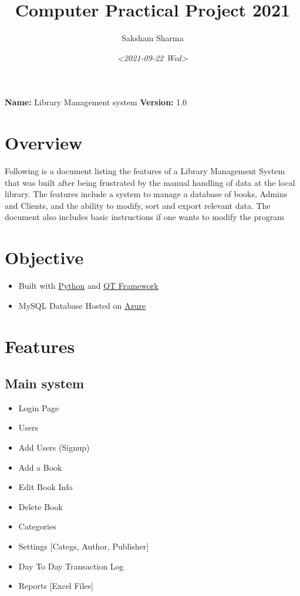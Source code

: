 \documentclass[11pt]{article}
\author{Saksham Sharma}
\date{\textit{<2021-09-22 Wed>}}
\title{Computer Practical Project 2021}
\begin{document}
\maketitle
\tableofcontents

\textbf{\textbf{Name:}} Library Management system
\textbf{\textbf{Version:}} 1.0

\section{Overview}
\label{sec:org83c6530}
Following is a document listing the features of a Library Management System that was built after being frustrated by the manual handling of data at the local library. The features include a system to manage a database of books, Admins and Clients, and the ability to modify, sort and export relevant data.
The document also includes basic instructions if one wants to modify the program

\section{Objective}
\label{sec:orgd7d8056}
\begin{itemize}
\item Built with \href{https://www.python.org/}{Python} and \href{https://www.qt.io/}{QT Framework}
\item MySQL Database Hosted on \href{//azure.microsoft.com}{Azure}
\end{itemize}

\section{Features}
\label{sec:org6a543fb}
\subsection{Main system}
\label{sec:orgf987840}
\begin{itemize}
\item Login Page
\item Users
\item Add Users (Signup)
\item Add a Book
\item Edit Book Info
\item Delete Book
\item Categories
\item Settings [Categs, Author, Publisher]
\item Day To Day Transaction Log
\item Reports [Excel Files]
\end{itemize}
\end{document}
